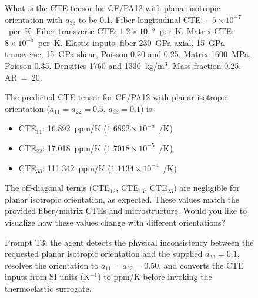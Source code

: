 \documentclass[preprint,review,10pt,number]{elsarticle}
\begin{document}
\begin{figure}[h]
\begin{tcolorbox}[
    colback=gray!5,
    colframe=black,
    boxrule=0.6pt,
    arc=2pt,
    left=8pt, right=8pt, top=6pt, bottom=6pt,
    title={\textbf{Prompt T3} \hfill \textit{Contradictory orientation \& unit conversion}},
    fonttitle=\small
]
\begin{tcolorbox}[
    colback=gray!8,
    colframe=gray!60,
    boxrule=0.5pt,
    arc=2pt,
    left=6pt, right=6pt, top=4pt, bottom=4pt,
    title={\textbf{User}},
    fonttitle=\small\bfseries,
    coltitle=black
]
\small
What is the CTE tensor for CF/PA12 with planar isotropic orientation 
with $a_{33}$ to be 0.1, Fiber longitudinal CTE: $-5\times10^{-7}$~per~K. 
Fiber transverse CTE: $1.2\times10^{-5}$~per~K. Matrix CTE: 
$8\times10^{-5}$~per~K. Elastic inputs: fiber 230~GPa axial, 15~GPa 
transverse, 15~GPa shear, Poisson 0.20 and 0.25. Matrix 1600~MPa, 
Poisson 0.35. Densities 1760 and 1330~kg/m$^3$. Mass fraction 0.25, 
AR~=~20.
\end{tcolorbox}
\vspace{6pt}
\begin{tcolorbox}[
    colback=gray!3,
    colframe=gray!40,
    boxrule=0.5pt,
    arc=2pt,
    left=6pt, right=6pt, top=4pt, bottom=4pt,
    title={\textbf{\texttt{MateriAl}}},
    fonttitle=\small\bfseries,
    coltitle=black
]
\small
The predicted CTE tensor for CF/PA12 with planar isotropic orientation ($a_{11} = a_{22} = 0.5$, $a_{33} = 0.1$) is:
\vspace{4pt}
\begin{itemize}[leftmargin=1.2em, itemsep=0pt, topsep=2pt]
\item CTE$_{11}$: 16.892~ppm/K ($1.6892\times10^{-5}$~/K)
\item CTE$_{22}$: 17.018~ppm/K ($1.7018\times10^{-5}$~/K)
\item CTE$_{33}$: 111.342~ppm/K ($1.1134\times10^{-4}$~/K)
\end{itemize}
The off-diagonal terms (CTE$_{12}$, CTE$_{13}$, CTE$_{23}$) are negligible for planar isotropic orientation, as expected. These values match the provided fiber/matrix CTEs and microstructure.
\vspace{4pt}
Would you like to visualize how these values change with different orientations?
\end{tcolorbox}
\end{tcolorbox}
\caption{Prompt T3: the agent detects the physical inconsistency 
between the requested planar isotropic orientation and the supplied 
$a_{33} = 0.1$, resolves the orientation to $a_{11} = a_{22} = 0.50$, 
and converts the CTE inputs from SI units (K$^{-1}$) to ppm/K before 
invoking the thermoelastic surrogate.}
\label{fig:t3}
\end{figure}
\end{document}
